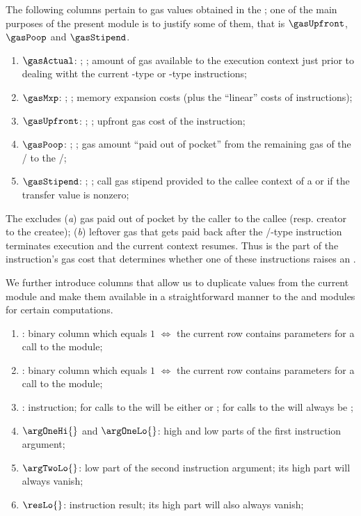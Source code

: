 The following columns pertain to gas values obtained in the \hubMod{};
one of the main purposes of the present module is to justify some of them, that is
$\gasUpfront$, $\gasPoop$ and $\gasStipend$.
\begin{enumerate}[resume]
	\item $\gasActual$: \godGiven{};
		\ccc{}; amount of gas available to the execution context just prior to dealing witht the current -type or -type instructions;
	\item $\gasMxp$: \godGiven{};
		\ccc{}; memory expansion costs (plus the ``linear'' costs of  instructions);
	\item $\gasUpfront$: \godGiven{};
		\ccc{}; upfront gas cost of the instruction;
	\item $\gasPoop$: \godGiven{};
		\ccc{}; gas amount ``paid out of pocket'' from the remaining gas of the \callerr{}/\creator{} to the \calleee{}/\createe{};	
	\item $\gasStipend$: \godGiven{};
		\ccc{}; call gas stipend provided to the callee context of a  or  if the transfer value is nonzero; 
\end{enumerate}
\saNote{}
The \gasUpfront{} excludes
(\emph{a}) gas paid out of pocket by the caller to the callee (resp. creator to the createe);
(\emph{b}) leftover gas that gets paid back after the /-type instruction terminates execution and the current context resumes.
Thus \gasUpfront{} is the part of the instruction's gas cost that determines whether one of these instructions raises an \oogxSH{}.

We further introduce columns that allow us to duplicate values from the current module and make them available in a straightforward manner to the \wcpMod{} and \modMod{} modules for certain computations.
\begin{enumerate}[resume]
	\item \wcpLookupFlag{}:
		binary column which equals $1$ $\iff$ the current row contains parameters for a call to the \wcpMod{} module;
	\item \divLookupFlag{}:
		binary column which equals $1$ $\iff$ the current row contains parameters for a call to the \modMod{} module;
	\item \exoInst{}:
		instruction; for calls to the \wcpMod{} will be either  or ; for calls to the \modMod{} will always be ;
	\item $\argOneHi{}$ and $\argOneLo{}$:
		high and low parts of the first instruction argument;
	\item $\argTwoLo{}$:
		low part of the second instruction argument; its high part will always vanish;
	\item $\resLo{}$:
		instruction result; its high part will also always vanish; 
\end{enumerate}
